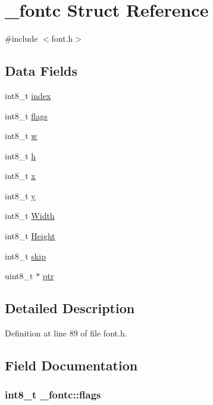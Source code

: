 \hypertarget{struct__fontc}{\section{\-\_\-fontc Struct Reference}
\label{struct__fontc}
}


{\ttfamily \#include $<$font.\-h$>$}

\subsection*{Data Fields}
\begin{DoxyCompactItemize}
\item 
int8\-\_\-t \hyperlink{struct__fontc_a7cc0370744ff7ea964054d36917c9a2f}{index}
\item 
int8\-\_\-t \hyperlink{struct__fontc_aa74d9a5513b529b5e444f283afea40ef}{flags}
\item 
int8\-\_\-t \hyperlink{struct__fontc_a9c2af0354d2b2009e7b6684e25fd479b}{w}
\item 
int8\-\_\-t \hyperlink{struct__fontc_a9feb8c838dfc1d4eebb15c8e53981944}{h}
\item 
int8\-\_\-t \hyperlink{struct__fontc_ad15d00ed46ebe52a085cf05b5ca5da90}{x}
\item 
int8\-\_\-t \hyperlink{struct__fontc_aebbde0dc41068722ee1a69f4a56478a4}{y}
\item 
int8\-\_\-t \hyperlink{struct__fontc_ae3c802e1c35ae9a4e37c8eb2e9644325}{Width}
\item 
int8\-\_\-t \hyperlink{struct__fontc_a98f97c237dfb1027c38813a17ef6dcd6}{Height}
\item 
int8\-\_\-t \hyperlink{struct__fontc_a44c94e91afa006cb2ffe55a99b3e2d3c}{skip}
\item 
uint8\-\_\-t $\ast$ \hyperlink{struct__fontc_a60a3fef5ccd80dff543aac3f22f74876}{ptr}
\end{DoxyCompactItemize}


\subsection{Detailed Description}


Definition at line 89 of file font.\-h.



\subsection{Field Documentation}
\hypertarget{struct__fontc_aa74d9a5513b529b5e444f283afea40ef}{
\subsubsection[{flags}]{\setlength{\rightskip}{0pt plus 5cm}int8\-\_\-t \-\_\-fontc\-::flags}}\label{struct__fontc_aa74d9a5513b529b5e444f283afea40ef}


